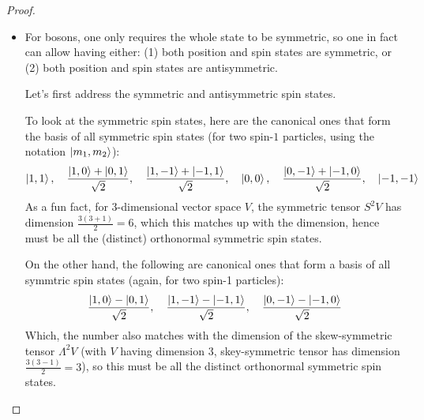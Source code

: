 \documentclass{article}
\begin{document}
\begin{proof}
\begin{itemize}
\begin{align}
        \end{align}
        So, the allowed first excited states are:
        \begin{align}
            &\text{First excited states: }\\
            &\psi_{10,+}\chi_\text{anti} = \frac{mw}{\sqrt{\pi}\hbar}(x_1+x_2)e^{-\frac{mw}{2\hbar}(x_1^2+x_2^2)}\cdot\frac{\ket{\uparrow\downarrow}-\ket{\downarrow\uparrow}}{\sqrt{2}}\\
            \\
            &\psi_{10,-}\chi_\text{symm} = \frac{mw}{\sqrt{\pi}\hbar}(x_1-x_2)e^{-\frac{mw}{2\hbar}(x_1^2+x_2^2)}\chi,\quad \|\chi_\text{symm}\|=1,\quad \chi_\text{symm}\in\span_\CC\left\{\ket{\uparrow\uparrow},\quad \frac{\ket{\uparrow\downarrow}+\ket{\downarrow\uparrow}}{\sqrt{2}}, \quad \ket{\downarrow\downarrow}x\right\}\\
            \\
            &\text{Energy: } E_{10}= 2\hbar w
        \end{align}

        \hfil

        \item[(b)] For bosons, one only requires the whole state to be symmetric, so one in fact can allow having either: (1) both position and spin states are symmetric, or (2) both position and spin states are antisymmetric.
        
        \hfil

        Let's first address the symmetric and antisymmetric spin states. 

        To look at the symmetric spin states, here are the canonical ones that form the basis of all symmetric spin states (for two spin-$1$ particles, using the notation $\ket{m_1,m_2}$):
        \begin{align}
            \ket{1,1},\quad \frac{\ket{1,0}+\ket{0,1}}{\sqrt{2}},\quad \frac{\ket{1,-1}+\ket{-1,1}}{\sqrt{2}},\quad \ket{0,0},\quad \frac{\ket{0,-1}+\ket{-1,0}}{\sqrt{2}},\quad \ket{-1,-1}
        \end{align}
        As a fun fact, for $3$-dimensional vector space $V$, the symmetric tensor $S^2V$ has dimension $\frac{3(3+1)}{2}=6$, which this matches up with the dimension, hence must be all the (distinct) orthonormal symmetric spin states.

        On the other hand, the following are canonical ones that form a basis of all symmtric spin states (again, for two spin-1 particles):
        \begin{align}
            \frac{\ket{1,0}-\ket{0,1}}{\sqrt{2}},\quad \frac{\ket{1,-1}-\ket{-1,1}}{\sqrt{2}},\quad \frac{\ket{0,-1}-\ket{-1,0}}{\sqrt{2}}
        \end{align}
        Which, the number also matches with the dimension of the skew-symmetric tensor $\Lambda^2 V$ (with $V$ having dimension $3$, skey-symmetric tensor has dimension $\frac{3(3-1)}{2}=3$), so this must be all the distinct orthonormal symmetric spin states.


\end{itemize}
\end{proof}
\end{document}
